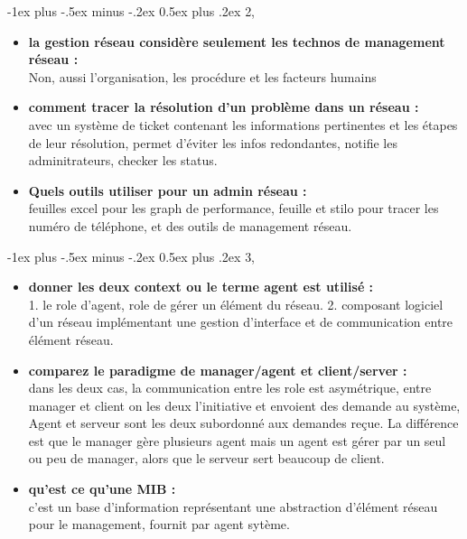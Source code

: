 \documentclass[12pt,landscape]{article}
\makeatletter
\renewcommand{\section}{\@startsection{section}{1}{0mm}%
                                {-1ex plus -.5ex minus -.2ex}%
                                {0.5ex plus .2ex}%
                                {\normalfont\large\bfseries}}
\makeatother
\begin{document}
\begin{multicols}{2}
\begin{enumerate}
\end{enumerate}
\section{2, }
\begin{itemize}
 \item \textbf{la gestion réseau considère seulement les technos de management réseau : }\\
 Non, aussi l'organisation, les procédure et les facteurs humains
 
 \item \textbf{comment tracer la résolution d'un problème dans un réseau : }\\
 avec un système de ticket contenant les informations pertinentes et les étapes de leur résolution, permet d'éviter les infos redondantes, notifie les adminitrateurs, checker les status.
 
 \item \textbf{Quels outils utiliser pour un admin réseau :}\\
 feuilles excel pour les graph de performance, feuille et stilo pour tracer les numéro de téléphone, et des outils de management réseau.
 
\end{itemize}


\section{3, }

\begin{itemize}
 \item \textbf{donner les deux context ou le terme agent est utilisé :}\\
 1. le role d'agent, role de gérer un élément du réseau. 2. composant logiciel d'un réseau implémentant une gestion d'interface et de communication entre élément réseau.
 
 \item \textbf{comparez le paradigme de manager/agent et client/server : }\\
 dans les deux cas, la communication entre les role est asymétrique, entre manager et client on les deux l'initiative et envoient des demande au système, Agent et serveur sont les deux subordonné aux demandes reçue. La différence est que le manager gère plusieurs agent mais un agent est gérer par un seul ou peu de manager, alors que le serveur sert beaucoup de client.
 
 \item \textbf{qu'est ce qu'une MIB :}\\
 c'est un base d'information représentant une abstraction d'élément réseau pour le management, fournit par agent sytème.
 

\end{itemize}
\end{multicols}
\end{document}
